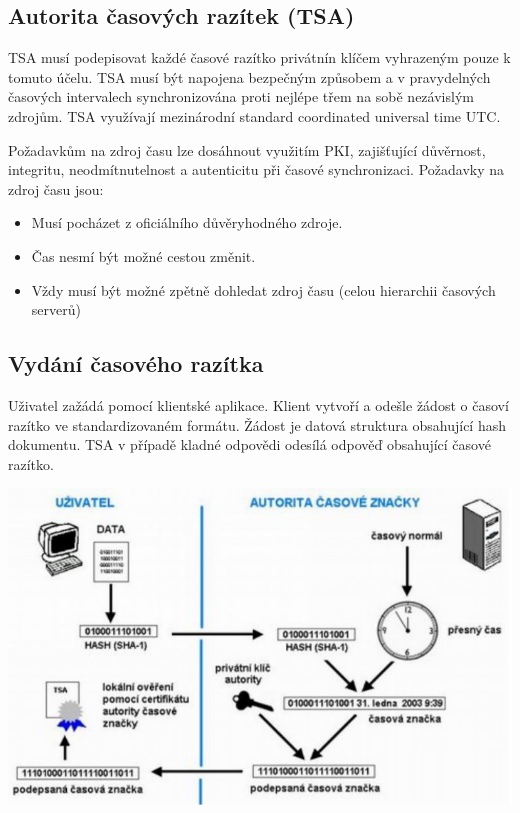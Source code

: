 \subsection{Autorita časových razítek (TSA)}

TSA musí podepisovat každé časové razítko privátnín klíčem vyhrazeným pouze k tomuto účelu. TSA musí být napojena bezpečným způsobem a v pravydelných časových intervalech synchronizována proti nejlépe třem na sobě nezávislým zdrojům. TSA využívají mezinárodní standard coordinated universal time UTC.

\noindent Požadavkům na zdroj času lze dosáhnout využitím PKI, zajišťující důvěrnost, integritu, neodmítnutelnost a autenticitu při časové synchronizaci. Požadavky na zdroj času jsou:

\begin{itemize}[noitemsep]
    \item Musí pocházet z oficiálního důvěryhodného zdroje.
    \item Čas nesmí být možné cestou změnit.
    \item Vždy musí být možné zpětně dohledat zdroj času (celou hierarchii časových serverů)
\end{itemize}

\subsection{Vydání časového razítka}

Uživatel zažádá pomocí klientské aplikace. Klient vytvoří a odešle žádost o časoví razítko ve standardizovaném formátu. Žádost je datová struktura obsahující hash dokumentu. TSA v případě kladné odpovědi odesílá odpověď obsahující časové razítko.

\begin{center}
\includegraphics[scale=0.7]{images/Timestamp.jpg}
\end{center}

